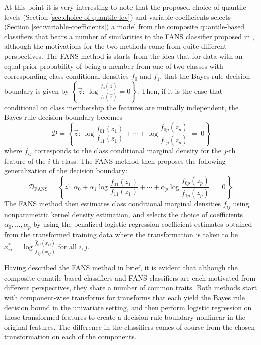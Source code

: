 At this point it is very interesting to note that the proposed choice of
quantile levels (Section \ref{sec:choice-of-quantile-lev}) and variable
coefficients selects (Section \ref{sec:variable-coefficients}) a model from the
composite quantile-based classifiers that bears a number of similarities to the
FANS classifier proposed in \cite{fan2016}, although the motivations for the two
methods come from quite different perspectives.  The FANS method is starts from
the idea that for data with an equal prior probability of being a member from
one of two classes with corresponding class conditional densities $f_0$ and
$f_1$, that the Bayes rule decision boundary is given by
$\left\{ \vec{z}{:}~ \log \frac{ f_0(\vec{z}) }{ f_1(\vec{z}) } = 0 \right\}$.
Then, if it is the case that conditional on class membership the features are
mutually independent, the Bayes rule decision boundary becomes
\begin{equation}
  \label{eq:bayes-rule-independent}
  \mathcal{D} = \left\{
    \vec{z} :~
    \log \frac{ f_{01}(z_1) }{ f_{11}(z_1) } +
    \cdots +
    \log \frac{ f_{0p}(z_p) }{ f_{1p}(z_p) }
    ~=~ 0
  \right\}
\end{equation}
where $f_{ij}$ corresponds to the class conditional marginal density for the
$j$-th feature of the $i$-th class.  The FANS method then proposes the following
generalization of the decision boundary:
\begin{equation}
  \label{eq:fans-rule}
  \mathcal{D}_{\scriptscriptstyle \text{FANS}} = \left\{
    \vec{z} :~ \alpha_0 + 
    \alpha_1 \log \frac{ f_{01}(z_1) }{ f_{11}(z_1) } +
    \cdots +
    \alpha_p \log \frac{ f_{0p}(z_p) }{ f_{1p}(z_p) }
    ~=~ 0
  \right\}.
\end{equation}
The FANS method then estimates class conditional marginal densities $f_{ij}$
using nonparametric kernel density estimation, and selects the choice of
coefficients $\alpha_0, \dots, \alpha_p$ by using the penalized logistic
regression coefficient estimates obtained from the transformed training data
where the transformation is taken to be
$x_{ij}^{*} = \log \frac{ \hat{f}_{0j}(x_{ij}) }{ \hat{f}_{1j}(x_{ij}) }$ for
all $i, j$.

Having described the FANS method in brief, it is evident that although the
composite quantile-based classifiers and FANS classifiers are each motivated
from different perspectives, they share a number of common traits.  Both methods
start with component-wise transforms for transforms that each yield the Bayes
rule decision bound in the univariate setting, and then perform logistic
regression on those transformed features to create a decision rule boundary
nonlinear in the original features.  The difference in the classifiers comes of
course from the chosen transformation on each of the components.

